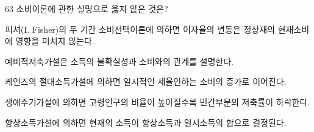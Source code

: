 \begin{question}{63}
소비이론에 관한 설명으로 옳지 않은 것은?
\begin{choices}
  \item 피셔(I. Fisher)의 두 기간 소비선택이론에 의하면 이자율의 변동은 정상재의 현재소비에 영향을 미치지 않는다.
  \item 예비적저축가설은 소득의 불확실성과 소비와의 관계를 설명한다.
  \item 케인즈의 절대소득가설에 의하면 일시적인 세율인하는 소비의 증가로 이어진다.
  \item 생애주기가설에 의하면 고령인구의 비율이 높아질수록 민간부문의 저축률이 하락한다.
  \item 항상소득가설에 의하면 현재의 소득이 항상소득과 일시소득의 합으로 결정된다.
\end{choices}
\end{question}
